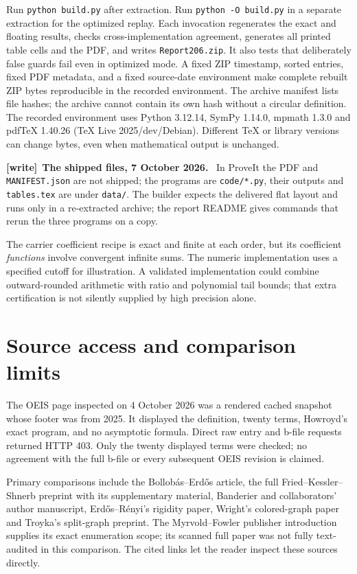 \documentclass[11pt]{article}
\theoremstyle{remark}\newtheorem{remark}[theorem]{Remark}
\newcommand{\file}[1]{\nolinkurl{#1}}
\newenvironment{writenote}[1][]{\par\smallskip\begingroup\small
 \noindent\textbf{[write]}\if\relax\detokenize{#1}\relax\else~\textbf{#1.}\fi\ }%
 {\par\endgroup\smallskip}
\begin{document}
Run \texttt{python build.py} after extraction. Run \texttt{python -O build.py} in a separate extraction for the optimized replay. Each invocation regenerates the exact and floating results, checks cross-implementation agreement, generates all printed table cells and the PDF, and writes \texttt{Report206.zip}. It also tests that deliberately false guards fail even in optimized mode. A fixed ZIP timestamp, sorted entries, fixed PDF metadata, and a fixed source-date environment make complete rebuilt ZIP bytes reproducible in the recorded environment. The archive manifest lists file hashes; the archive cannot contain its own hash without a circular definition. The recorded environment uses Python 3.12.14, SymPy 1.14.0, mpmath 1.3.0 and pdfTeX 1.40.26 (TeX Live 2025/dev/Debian). Different TeX or library versions can change bytes, even when mathematical output is unchanged.
\begin{writenote}[The shipped files, 7 October 2026]
In ProveIt the PDF and \file{MANIFEST.json} are not shipped; the programs are
\file{code/*.py}, their outputs and \file{tables.tex} are under \file{data/}.
The builder expects the delivered flat layout and runs only in a re-extracted
archive; the report README gives commands that rerun the three programs on a
copy.
\end{writenote}

The carrier coefficient recipe is exact and finite at each order, but its coefficient \emph{functions} involve convergent infinite sums. The numeric implementation uses a specified cutoff for illustration. A validated implementation could combine outward-rounded arithmetic with ratio and polynomial tail bounds; that extra certification is not silently supplied by high precision alone.

\section{Source access and comparison limits}\label{mis:sec:sources}
The OEIS page inspected on 4 October 2026 was a rendered cached snapshot whose footer was from 2025. It displayed the definition, twenty terms, Howroyd's exact program, and no asymptotic formula. Direct raw entry and b-file requests returned HTTP 403. Only the twenty displayed terms were checked; no agreement with the full b-file or every subsequent OEIS revision is claimed.

Primary comparisons include the Bollob\'as--Erd\H{o}s article, the full Fried--Kessler--Shnerb preprint with its supplementary material, Banderier and collaborators' author manuscript, Erd\H{o}s--R\'enyi's rigidity paper, Wright's colored-graph paper and Troyka's split-graph preprint. The Myrvold--Fowler publisher introduction supplies its exact enumeration scope; its scanned full paper was not fully text-audited in this comparison. The cited links let the reader inspect these sources directly.
\end{document}
